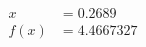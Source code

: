 \documentclass[preview]{standalone}
\begin{document}
\begin{align*}
x &= 0.2689\\f(x) &= 4.4667327
\end{align*}
\end{document}
